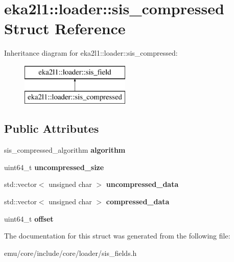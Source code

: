 \hypertarget{structeka2l1_1_1loader_1_1sis__compressed}{}\section{eka2l1\+:\+:loader\+:\+:sis\+\_\+compressed Struct Reference}
\label{structeka2l1_1_1loader_1_1sis__compressed}
Inheritance diagram for eka2l1\+:\+:loader\+:\+:sis\+\_\+compressed\+:\begin{figure}[H]
\begin{center}
\leavevmode
\includegraphics[height=2.000000cm]{structeka2l1_1_1loader_1_1sis__compressed}
\end{center}
\end{figure}
\subsection*{Public Attributes}
\begin{DoxyCompactItemize}
\item 
\mbox{\label{structeka2l1_1_1loader_1_1sis__compressed_a5bf152718afd5c0e421c410af47c32d6}} 
sis\+\_\+compressed\+\_\+algorithm {\bfseries algorithm}
\item 
\mbox{\label{structeka2l1_1_1loader_1_1sis__compressed_a95c296c1e31bc631e9900e5efd53676b}} 
uint64\+\_\+t {\bfseries uncompressed\+\_\+size}
\item 
\mbox{\label{structeka2l1_1_1loader_1_1sis__compressed_a18dd4d39f2e8099622f2c8dfe2481b87}} 
std\+::vector$<$ unsigned char $>$ {\bfseries uncompressed\+\_\+data}
\item 
\mbox{\label{structeka2l1_1_1loader_1_1sis__compressed_a6d1e1ed69722d0bf4959362338326a92}} 
std\+::vector$<$ unsigned char $>$ {\bfseries compressed\+\_\+data}
\item 
\mbox{\label{structeka2l1_1_1loader_1_1sis__compressed_a3391c1aca2dd7e53446633f5a33ae196}} 
uint64\+\_\+t {\bfseries offset}
\end{DoxyCompactItemize}


The documentation for this struct was generated from the following file\+:\begin{DoxyCompactItemize}
\item 
emu/core/include/core/loader/sis\+\_\+fields.\+h\end{DoxyCompactItemize}
